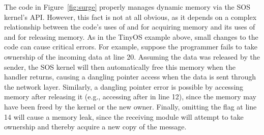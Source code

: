 The code in Figure~\ref{fig:surge} properly manages dynamic memory via the
SOS kernel's API.  However, this fact is
not at all obvious, as it depends on a complex relationship between the code's 
uses of
 and  for acquiring memory
and its uses of  and  for
releasing memory.  As in the TinyOS example above, small changes to
the code can cause critical errors.  For example, suppose the
programmer fails to take ownership of the incoming data at line 20.
Assuming the data was released by the sender, the SOS kernel will then
automatically free this memory when the handler returns, causing a
dangling pointer access when the data is sent through the network
layer.  Similarly, a dangling pointer error is possible by 
accessing memory after releasing it (e.g., accessing  after
 in line 12), since the memory may have been freed by
the kernel or the new owner.
Finally, omitting the  flag at line 14 will
cause a memory leak, since the receiving module will attempt to take
ownership and thereby acquire a new copy of the message.
 



